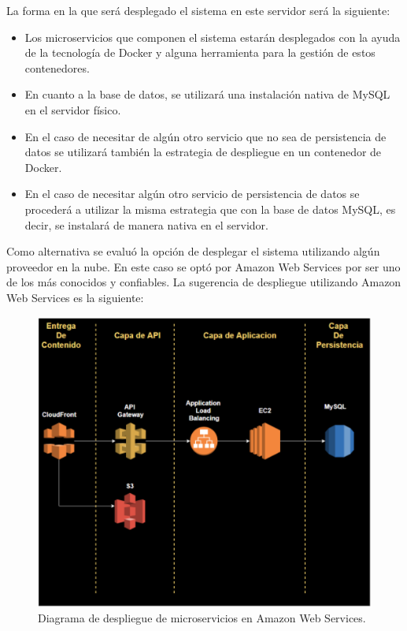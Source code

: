 La forma en la que será desplegado el sistema en este servidor será la siguiente:
\begin{itemize}
	\item Los microservicios que componen el sistema estarán desplegados con la ayuda de la tecnología de Docker y alguna herramienta para la gestión de estos contenedores.
	\item En cuanto a la base de datos, se utilizará una instalación nativa de MySQL en el servidor físico.
	\item En el caso de necesitar de algún otro servicio que no sea de persistencia de datos se utilizará también la estrategia de despliegue en un contenedor de Docker.
	\item En el caso de necesitar algún otro servicio de persistencia de datos se procederá a utilizar la misma estrategia que con la base de datos MySQL, es decir, se instalará de manera nativa en el servidor.\\
\end{itemize}

Como alternativa se evaluó la opción de desplegar el sistema utilizando algún proveedor en la nube. En este caso se optó por Amazon Web Services por ser uno de los más conocidos y confiables. La sugerencia de despliegue utilizando Amazon Web Services es la siguiente: \\

\begin{figure}[H]
	\centering
	\includegraphics[width=\textwidth]{imagenes/aws_archi.png} 
	\caption{Diagrama de despliegue de microservicios en Amazon Web Services.}
\end{figure}

